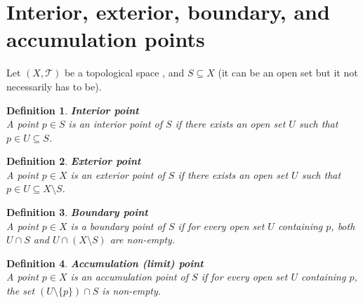 \documentclass[11pt]{book} %
\newtheorem{definition}{Definition}[section]
\begin{document}
\section{Interior, exterior, boundary, and accumulation points}

Let \( (X, \mathcal{T}) \) be a topological space , and \( S \subseteq X \) (it can be an open set but it not necessarily has to be).

\begin{definition}{\textbf{Interior point}} \\
    A point \( p \in S \) is an interior point of \( S \) if there exists an open set \( U \) such that \( p \in U \subseteq S \).
\end{definition}

\begin{definition}{\textbf{Exterior point}} \\
    A point \( p \in X \) is an exterior point of \( S \) if there exists an open set \( U \) such that \( p \in U \subseteq X \setminus S \).
\end{definition}

\begin{definition}{\textbf{Boundary point}} \\
    A point \( p \in X \) is a boundary point of \( S \) if for every open set \( U \) containing \( p \), both \( U \cap S \) and \( U \cap (X \setminus S) \) are non-empty.
\end{definition}

\begin{definition}{\textbf{Accumulation (limit) point}} \\
    A point \( p \in X \) is an accumulation point of \( S \) if for every open set \( U \) containing \( p \), the set \( ( U \setminus \{p\} ) \cap S \) is non-empty.
\end{definition}
\end{document}
